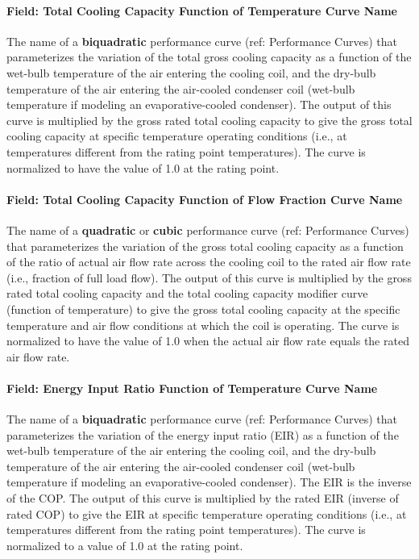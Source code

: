 \paragraph{Field: Total Cooling Capacity Function of Temperature Curve Name}\label{field-total-cooling-capacity-function-of-temperature-curve-name-2}

The name of a \textbf{biquadratic} performance curve (ref: Performance Curves) that parameterizes the variation of the total gross cooling capacity as a function of the wet-bulb temperature of the air entering the cooling coil, and the dry-bulb temperature of the air entering the air-cooled condenser coil (wet-bulb temperature if modeling an evaporative-cooled condenser). The output of this curve is multiplied by the gross rated total cooling capacity to give the gross total cooling capacity at specific temperature operating conditions (i.e., at temperatures different from the rating point temperatures). The curve is normalized to have the value of 1.0 at the rating point.

\paragraph{Field: Total Cooling Capacity Function of Flow Fraction Curve Name}\label{field-total-cooling-capacity-function-of-flow-fraction-curve-name-2}

The name of a \textbf{quadratic} or \textbf{cubic} performance curve (ref: Performance Curves) that parameterizes the variation of the gross total cooling capacity as a function of the ratio of actual air flow rate across the cooling coil to the rated air flow rate (i.e., fraction of full load flow). The output of this curve is multiplied by the gross rated total cooling capacity and the total cooling capacity modifier curve (function of temperature) to give the gross total cooling capacity at the specific temperature and air flow conditions at which the coil is operating. The curve is normalized to have the value of 1.0 when the actual air flow rate equals the rated air flow rate.

\paragraph{Field: Energy Input Ratio Function of Temperature Curve Name}\label{field-energy-input-ratio-function-of-temperature-curve-name-2}

The name of a \textbf{biquadratic} performance curve (ref: Performance Curves) that parameterizes the variation of the energy input ratio (EIR) as a function of the wet-bulb temperature of the air entering the cooling coil, and the dry-bulb temperature of the air entering the air-cooled condenser coil (wet-bulb temperature if modeling an evaporative-cooled condenser). The EIR is the inverse of the COP. The output of this curve is multiplied by the rated EIR (inverse of rated COP) to give the EIR at specific temperature operating conditions (i.e., at temperatures different from the rating point temperatures). The curve is normalized to a value of 1.0 at the rating point.

